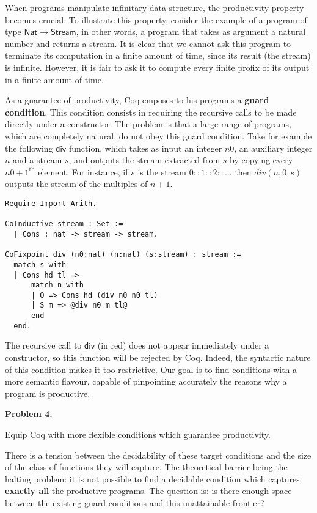 \documentclass[11pt,twocolumn]{article}
\begin{document}
When programs manipulate infinitary data structure, the productivity property becomes crucial. To illustrate this property, conider the example of a program of type $\mathsf{Nat}\rightarrow \mathsf{Stream}$, in other words, a program that takes as argument a natural number and returns a stream. It is clear that we cannot ask this program to terminate its computation in a finite amount of time, since its result (the stream) is infinite. However, 
it is fair to ask it to compute every finite profix of its output in a finite amount of time. 


 
As a guarantee of productivity, Coq emposes to his programs a \textbf{guard condition}.
This condition consists in requiring the recursive calls to be made directly under a constructor. The problem is that a large range of programs, which are completely natural, do not obey this guard condition. Take for example the following $\mathsf{div}$ function, which takes as input an integer $n0$, an auxiliary integer $n$ and a stream $s$, and outputs the stream extracted from $s$ by copying every $n0+1^{\text{th}}$ element. For instance, if $s$ is the stream     
  $0::1::2::\dots$ then $div(n,0,s)$ outputs the stream of the multiples of $n+1$. 
\begin{lstlisting}[style=base]
Require Import Arith.

CoInductive stream : Set :=
  | Cons : nat -> stream -> stream.

CoFixpoint div (n0:nat) (n:nat) (s:stream) : stream :=
  match s with
  | Cons hd tl =>
      match n with
      | O => Cons hd (div n0 n0 tl)
      | S m => @div n0 m tl@
      end
  end.
\end{lstlisting}
The recursive call to $\mathsf{div}$ (in red) does not appear immediately under a constructor, so this function will be rejected by Coq.
  Indeed, the syntactic nature of this condition makes it too restrictive. 
Our goal is to find conditions with a more semantic flavour, capable of pinpointing accurately the reasons why a program is productive.

\begin{center}
\begin{bclogo}[logo= ,arrondi = 0.1, couleur = green!10,  epBarre = 0]{}
  \vspace{-10pt}
  \textbf{Problem 4.}
  
  Equip Coq with more flexible conditions which guarantee productivity. 
\end{bclogo}
\end{center}
There is a tension  between the decidability of these target conditions and the size of the class of functions they will capture. The theoretical barrier being the halting problem:
it is not possible to find a decidable condition which captures \textbf{exactly all} the productive programs. The question is: is there enough space between the existing guard conditions and this unattainable frontier?
\end{document}
